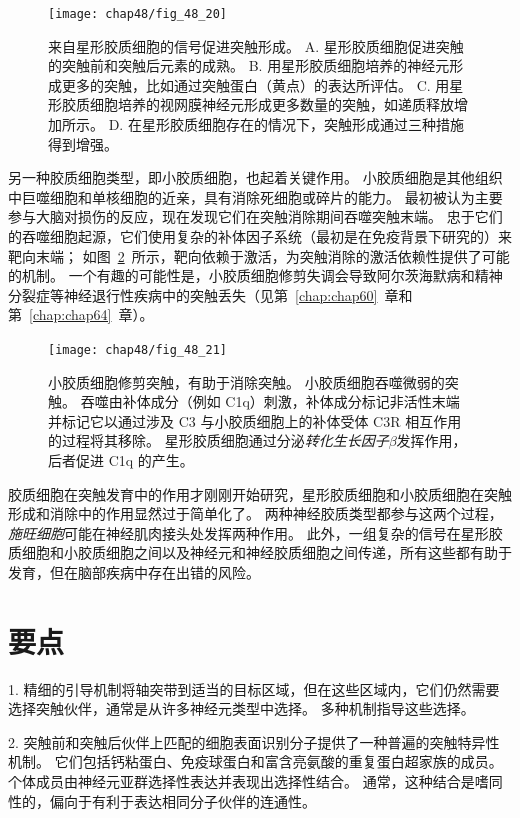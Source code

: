 \begin{figure}[htbp]
	\centering
	\texttt{[image: chap48/fig\_48\_20]}
	\caption{来自星形胶质细胞的信号促进突触形成。
		A. 星形胶质细胞促进突触的突触前和突触后元素的成熟。
		B. 用星形胶质细胞培养的神经元形成更多的突触，比如通过突触蛋白（黄点）的表达所评估。
		C. 用星形胶质细胞培养的视网膜神经元形成更多数量的突触，如递质释放增加所示。
		D. 在星形胶质细胞存在的情况下，突触形成通过三种措施得到增强。}
	\label{fig:48_20}
\end{figure}


另一种胶质细胞类型，即小胶质细胞，也起着关键作用。
小胶质细胞是其他组织中巨噬细胞和单核细胞的近亲，具有消除死细胞或碎片的能力。
最初被认为主要参与大脑对损伤的反应，现在发现它们在突触消除期间吞噬突触末端。
忠于它们的吞噬细胞起源，它们使用复杂的补体因子系统（最初是在免疫背景下研究的）来靶向末端；
如图~\ref{fig:48_21}~所示，靶向依赖于激活，为突触消除的激活依赖性提供了可能的机制。
一个有趣的可能性是，小胶质细胞修剪失调会导致阿尔茨海默病和精神分裂症等神经退行性疾病中的突触丢失（见第~\ref{chap:chap60}~章和第~\ref{chap:chap64}~章）。


\begin{figure}[htbp]
	\centering
	\texttt{[image: chap48/fig\_48\_21]}
	\caption{小胶质细胞修剪突触，有助于消除突触。
		小胶质细胞吞噬微弱的突触。
		吞噬由补体成分（例如 C1q）刺激，补体成分标记非活性末端并标记它以通过涉及 C3 与小胶质细胞上的补体受体 C3R 相互作用的过程将其移除。
		星形胶质细胞通过分泌\textit{转化生长因子$\beta$}发挥作用，后者促进 C1q 的产生\cite{allen2014astrocyte}。}
	\label{fig:48_21}
\end{figure}


胶质细胞在突触发育中的作用才刚刚开始研究，星形胶质细胞和小胶质细胞在突触形成和消除中的作用显然过于简单化了。
两种神经胶质类型都参与这两个过程，\textit{施旺细胞}可能在神经肌肉接头处发挥两种作用。
此外，一组复杂的信号在星形胶质细胞和小胶质细胞之间以及神经元和神经胶质细胞之间传递，所有这些都有助于发育，但在脑部疾病中存在出错的风险。



\section{要点}

1. 精细的引导机制将轴突带到适当的目标区域，但在这些区域内，它们仍然需要选择突触伙伴，通常是从许多神经元类型中选择。
多种机制指导这些选择。


2. 突触前和突触后伙伴上匹配的细胞表面识别分子提供了一种普遍的突触特异性机制。
它们包括钙粘蛋白、免疫球蛋白和富含亮氨酸的重复蛋白超家族的成员。
个体成员由神经元亚群选择性表达并表现出选择性结合。
通常，这种结合是嗜同性的，偏向于有利于表达相同分子伙伴的连通性。


